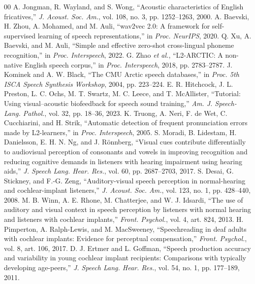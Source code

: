 \documentclass[conference]{IEEEtran}
\begin{document}
\begin{thebibliography}{00}
 A. Jongman, R. Wayland, and S. Wong, ``Acoustic characteristics of English fricatives,'' \textit{J. Acoust. Soc. Am.}, vol. 108, no. 3, pp. 1252--1263, 2000.
 A. Baevski, H. Zhou, A. Mohamed, and M. Auli, ``wav2vec 2.0: A framework for self-supervised learning of speech representations,'' in \textit{Proc. NeurIPS}, 2020.
 Q. Xu, A. Baevski, and M. Auli, ``Simple and effective zero-shot cross-lingual phoneme recognition,'' in \textit{Proc. Interspeech}, 2022.
 G. Zhao \textit{et al.}, ``L2-ARCTIC: A non-native English speech corpus,'' in \textit{Proc. Interspeech}, 2018, pp. 2783--2787.
 J. Kominek and A. W. Black, ``The CMU Arctic speech databases,'' in \textit{Proc. 5th ISCA Speech Synthesis Workshop}, 2004, pp. 223--224.
 E. R. Hitchcock, J. L. Preston, L. C. Ochs, M. T. Swartz, M. C. Leece, and T. McAllister, ``Tutorial: Using visual--acoustic biofeedback for speech sound training,'' \textit{Am. J. Speech-Lang. Pathol.}, vol. 32, pp. 18--36, 2023.
 K. Truong, A. Neri, F. de Wet, C. Cucchiarini, and H. Strik, ``Automatic detection of frequent pronunciation errors made by L2-learners,'' in \textit{Proc. Interspeech}, 2005.
 S. Moradi, B. Lidestam, H. Danielsson, E. H. N. Ng, and J. R{\"o}nnberg, ``Visual cues contribute differentially to audiovisual perception of consonants and vowels in improving recognition and reducing cognitive demands in listeners with hearing impairment using hearing aids,'' \textit{J. Speech Lang. Hear. Res.}, vol. 60, pp. 2687--2703, 2017.
 S. Desai, G. Stickney, and F.-G. Zeng, ``Auditory-visual speech perception in normal-hearing and cochlear-implant listeners,'' \textit{J. Acoust. Soc. Am.}, vol. 123, no. 1, pp. 428--440, 2008.
 M. B. Winn, A. E. Rhone, M. Chatterjee, and W. J. Idsardi, ``The use of auditory and visual context in speech perception by listeners with normal hearing and listeners with cochlear implants,'' \textit{Front. Psychol.}, vol. 4, art. 824, 2013.
 H. Pimperton, A. Ralph-Lewis, and M. MacSweeney, ``Speechreading in deaf adults with cochlear implants: Evidence for perceptual compensation,'' \textit{Front. Psychol.}, vol. 8, art. 106, 2017.
 D. J. Ertmer and L. Goffman, ``Speech production accuracy and variability in young cochlear implant recipients: Comparisons with typically developing age-peers,'' \textit{J. Speech Lang. Hear. Res.}, vol. 54, no. 1, pp. 177--189, 2011.

\end{thebibliography}
\end{document}
